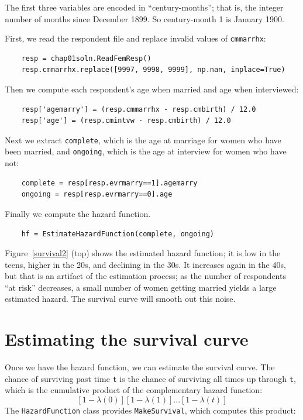 \documentclass[12pt]{book}
\begin{document}
The first three variables are encoded in ``century-months''; that is, the
integer number of months since December 1899.  So century-month
1 is January 1900.

First, we read the respondent file and replace invalid values of
{\tt cmmarrhx}:

\begin{verbatim}
    resp = chap01soln.ReadFemResp()
    resp.cmmarrhx.replace([9997, 9998, 9999], np.nan, inplace=True)
\end{verbatim}

Then we compute each respondent's age when married and age when
interviewed:

\begin{verbatim}
    resp['agemarry'] = (resp.cmmarrhx - resp.cmbirth) / 12.0
    resp['age'] = (resp.cmintvw - resp.cmbirth) / 12.0
\end{verbatim}

Next we extract {\tt complete}, which is the age at marriage for
women who have been married, and {\tt ongoing}, which is the
age at interview for women who have not:

\begin{verbatim}
    complete = resp[resp.evrmarry==1].agemarry
    ongoing = resp[resp.evrmarry==0].age
\end{verbatim}

Finally we compute the
hazard function.

\begin{verbatim}
    hf = EstimateHazardFunction(complete, ongoing)
\end{verbatim}

Figure~\ref{survival2} (top) shows the estimated hazard function;
it is low in the teens,
higher in the 20s, and declining in the 30s.  It increases again in
the 40s, but that is an artifact of the estimation process; as the
number of respondents ``at risk'' decreases, a small number of
women getting married yields a large estimated hazard.  The survival
curve will smooth out this noise.


\section{Estimating the survival curve}

Once we have the hazard function, we can estimate the survival curve.
The chance of surviving past time {\tt t} is the chance of surviving
all times up through {\tt t}, which is the cumulative product of
the complementary hazard function:
%
\[ [1-\lambda(0)] [1-\lambda(1)] ... [1-\lambda(t)] \]
%
The {\tt HazardFunction} class provides {\tt MakeSurvival}, which
computes this product:
\end{document}
